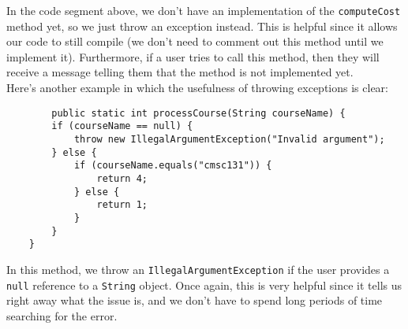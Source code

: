 In the code segment above, we don't have an implementation of the \verb!computeCost! method yet, so we just throw an exception instead. This is helpful since it allows our code to still compile (we don't need to comment out this method until we implement it). Furthermore, if a user tries to call this method, then they will receive a message telling them that the method is not implemented yet. \\


Here's another example in which the usefulness of throwing exceptions is clear:

\begin{lstlisting}
    	public static int processCourse(String courseName) {
		if (courseName == null) {
			throw new IllegalArgumentException("Invalid argument");
		} else {
			if (courseName.equals("cmsc131")) {
				return 4;
			} else {
				return 1;
			}
		}
	}
\end{lstlisting}

In this method, we throw an \verb!IllegalArgumentException! if the user provides a \verb!null! reference to a \verb!String! object.  Once again, this is very helpful since it tells us right away what the issue is, and we don't have to spend long periods of time searching for the error. 